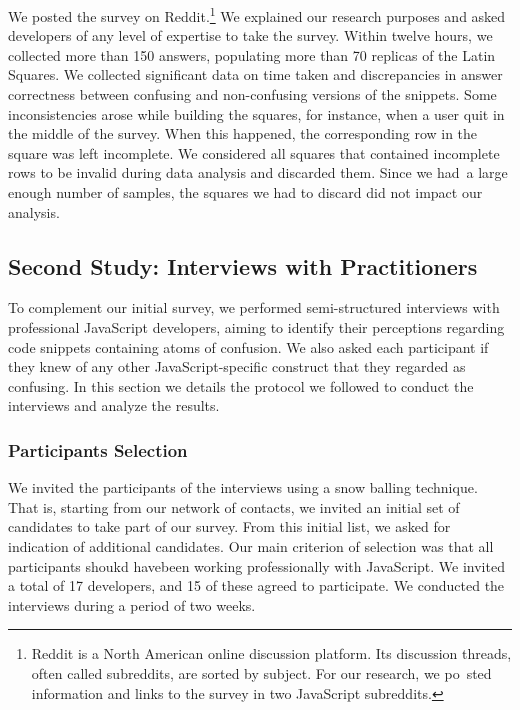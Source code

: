 We posted the survey on Reddit.\footnote{Reddit is a North American online discussion platform.
Its discussion threads, often called subreddits, are sorted by subject. For our research, we po\
sted information and links to the survey in two JavaScript subreddits.} We explained our research purposes and asked developers of any level of expertise to take the survey. Within twelve hours, we collected more than 150 answers, populating more than 70 replicas of the Latin Squares. We collected significant data on time taken and discrepancies in answer correctness between confusing and non-confusing versions of the snippets. Some inconsistencies arose while building the squares, for instance, when a user quit in the middle of the survey. When this happened, the corresponding row in the square was left incomplete. We considered all squares that contained incomplete rows to be invalid during data analysis and discarded them. Since we had\
 a large enough number of samples, the squares we had to discard did not impact our analysis.

 
\subsection{Second Study: Interviews with Practitioners}

To complement our initial survey, we performed semi-structured interviews with professional JavaScript developers, aiming to identify their perceptions regarding code snippets containing atoms of confusion. We also asked each participant if they knew of any other JavaScript-specific construct that they regarded as confusing. In this section we details the protocol we followed to conduct the interviews and analyze the results.


\subsubsection{Participants Selection} We invited the participants of the interviews using a snow balling technique. That is, starting from our network of contacts, we invited an initial set of candidates to take part of our survey. From this initial list, we asked for indication of additional candidates. Our main criterion of selection was that all participants shoukd havebeen working professionally with JavaScript. We invited a total of 17 developers, and 15 of these agreed to participate. We conducted the interviews during a period of two weeks.


